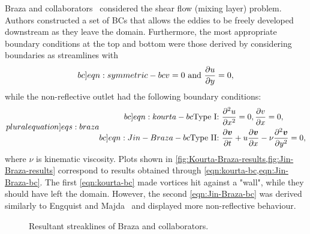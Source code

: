 \documentclass{article}
\numberwithin{equation}{section}
\begin{document}
Braza and collaborators~\cite{Jin:1993,Kourta:1987,Persillon:1998} considered the shear flow (mixing layer) problem. Authors constructed a set of BCs that allows the eddies to be freely developed downstream as they leave the domain. Furthermore, the most appropriate boundary conditions at the top and bottom were those derived by considering boundaries as streamlines with
\begin{equation}\label[bc]{eqn:symmetric-bc}
	v=0\text{ and } \frac{\partial u}{\partial y}=0,
\end{equation}
while the non-reflective outlet had the following boundary conditions: 
\begin{subequations}
\label[pluralequation]{eqs:braza}
\begin{align}
\label[bc]{eqn:kourta-bc}
	\text{Type I: }&\frac{\partial ^2u}{\partial x^2}=0,\frac{\partial v}{\partial x	}=0,\\
\label[bc]{eqn:Jin-Braza-bc}
	\text{Type II: }&\frac{\partial \boldsymbol{v}}{\partial t}+u\frac{\partial \boldsymbol{v}}{\partial x}-\nu \frac{\partial^2 \boldsymbol{v}}{\partial y^2}=0,
\end{align}
\end{subequations}
where $\nu$ is kinematic viscosity. 
Plots shown in \cref{fig:Kourta-Braza-results,fig:Jin-Braza-results} correspond to results obtained through \cref{eqn:kourta-bc,eqn:Jin-Braza-bc}.
	The first \cref{eqn:kourta-bc} made vortices hit against a "wall", while they should have left the domain. 
	However, the second \cref{eqn:Jin-Braza-bc} was derived similarly to Engquist and Majda~\cite{Engquist:1977} and displayed more non-reflective behaviour. 
\begin{figure}[H]
\centering
   \quad
\caption{\small Resultant streaklines of Braza and collaborators.}
\end{figure}
\end{document}
